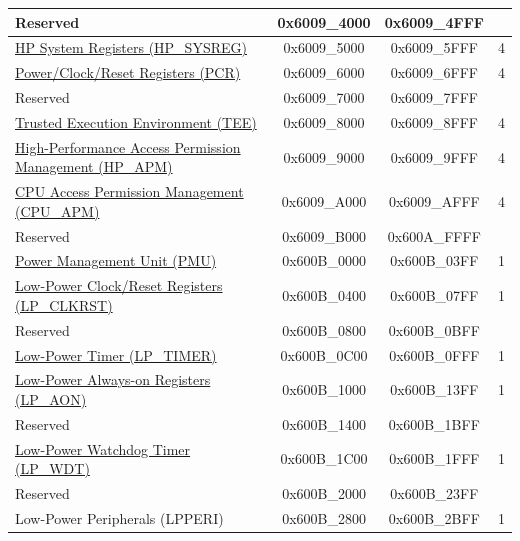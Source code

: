 \begin{ThreePartTable}
\begin{longtable}[c]{ |p{7cm}|c|c|r| }
\rowcolor{gray!25}  Reserved                    & 0x6009\_4000 & 0x6009\_4FFF &         \\\hline
\hyperref[mod:sysreg]{HP System Registers (HP\_SYSREG)}               & 0x6009\_5000 & 0x6009\_5FFF &   4     \\\hline
\hyperref[mod:resclk]{Power/Clock/Reset Registers (PCR)}                     & 0x6009\_6000 & 0x6009\_6FFF &   4     \\\hline
    \rowcolor{gray!25}  Reserved                    & 0x6009\_7000 & 0x6009\_7FFF &         \\\hline
\hyperref[mod:permctrl]{Trusted Execution Environment (TEE)} \tnote{\textcolor{red}{2}}                     & 0x6009\_8000 & 0x6009\_8FFF &   4 \\\hline
\hyperref[mod:permctrl]{High-Performance Access Permission Management (HP\_APM)}         & 0x6009\_9000 & 0x6009\_9FFF &   4 \\\hline
\hyperref[mod:permctrl]{CPU Access Permission Management (CPU\_APM)}        & 0x6009\_A000 & 0x6009\_AFFF &    4     \\\hline
    \rowcolor{gray!25}  Reserved                    & 0x6009\_B000 & 0x600A\_FFFF &         \\\hline
\hyperref[mod:lowpowm]{Power Management Unit (PMU)} & 0x600B\_0000 & 0x600B\_03FF &   1     \\\hline
\hyperref[mod:resclk]{Low-Power Clock/Reset Registers (LP\_CLKRST)}                  & 0x600B\_0400 & 0x600B\_07FF &   1     \\\hline
    \rowcolor{gray!25}  Reserved                    & 0x600B\_0800 & 0x600B\_0BFF &         \\\hline
\hyperref[mod:lowpowm]{Low-Power Timer (LP\_TIMER)}                   & 0x600B\_0C00 & 0x600B\_0FFF &   1     \\\hline
\hyperref[mod:lowpowm]{Low-Power Always-on Registers (LP\_AON)}                     & 0x600B\_1000 & 0x600B\_13FF &   1     \\\hline
\rowcolor{gray!25}  Reserved                    & 0x600B\_1400 & 0x600B\_1BFF &         \\\hline
\hyperref[mod:wdt]{Low-Power Watchdog Timer (LP\_WDT)}                     & 0x600B\_1C00 & 0x600B\_1FFF &   1     \\\hline
    \rowcolor{gray!25}  Reserved                    & 0x600B\_2000 & 0x600B\_23FF &         \\\hline
Low-Power Peripherals (LPPERI)                      & 0x600B\_2800 & 0x600B\_2BFF &   1     \\\hline

\end{longtable}
\end{ThreePartTable}
